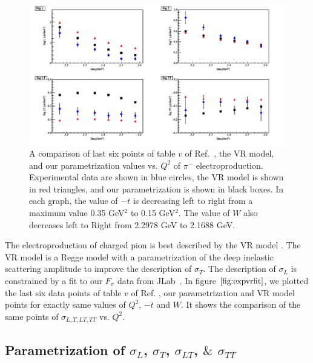 \begin{figure}[!hbt]
    \centering
    \includegraphics[width=6.0in,height=2.4in]{./figures/pimsigma_qsq.pdf}
    \caption{A comparison of last six points of table $v$ of
Ref.~\cite{gmhuber-2}, the VR model, and our parametrization values vs. $Q^{2}$
of $\pi^{-}$ electroproduction. Experimental data are shown in blue circles,
the VR model is shown in red triangles, and our parametrization is shown in
black boxes. In each graph, the value of $-t$ is decreasing left to right from
a maximum value 0.35 GeV$^2$ to 0.15 GeV$^2$. The value of $W$ also decreases
left to Right from 2.2978 GeV to 2.1688 GeV.}
    \label{fig:expvrfit}
\end{figure}

The electroproduction of charged pion is best described by the VR model
\cite{vr}. The VR model is a Regge model with a parametrization of the deep
inelastic scattering amplitude to improve the description of $\sigma_{T}$. The
description of $\sigma_{L}$ is constrained by a fit to our $F_{\pi}$ data from
JLab~\cite{gmhuber}. In figure $\ref{fig:expvrfit}$, we plotted the last six
data points of table $v$ of Ref. \cite{gmhuber-2}, our parametrization and VR
model points for exactly same values of $Q^2$, $-t$ and $W$. It shows the
comparison of the same points of $\sigma_{L,T,LT,TT}$ vs. $Q^{2}$.

\subsection{Parametrization of $\sigma_{L}$, $\sigma_{T}$, $\sigma_{LT}$, $\&$
$\sigma_{TT}$
\label{parametrization}}

